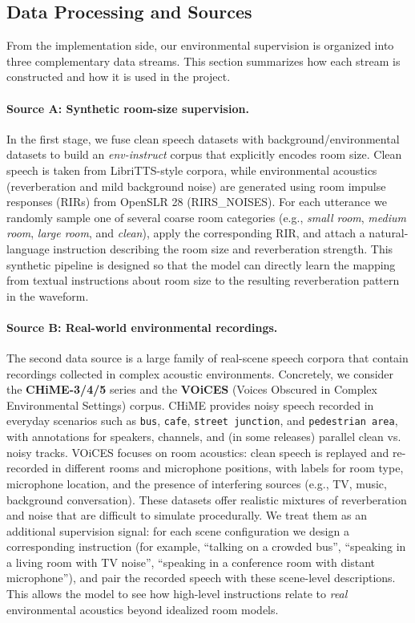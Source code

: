 \documentclass{article}
\begin{document}
\subsection{Data Processing and Sources}

From the implementation side, our environmental supervision is organized into three complementary data streams. This section summarizes how each stream is constructed and how it is used in the project.

\paragraph{Source A: Synthetic room-size supervision.}
In the first stage, we fuse clean speech datasets with background/environmental datasets to build an \emph{env-instruct} corpus that explicitly encodes room size. Clean speech is taken from LibriTTS-style corpora, while environmental acoustics (reverberation and mild background noise) are generated using room impulse responses (RIRs) from OpenSLR 28 (RIRS\_NOISES). For each utterance we randomly sample one of several coarse room categories (e.g., \emph{small room}, \emph{medium room}, \emph{large room}, and \emph{clean}), apply the corresponding RIR, and attach a natural-language instruction describing the room size and reverberation strength. This synthetic pipeline is designed so that the model can directly learn the mapping from textual instructions about room size to the resulting reverberation pattern in the waveform.

\paragraph{Source B: Real-world environmental recordings.}
The second data source is a large family of real-scene speech corpora that contain recordings collected in complex acoustic environments. Concretely, we consider the \textbf{CHiME-3/4/5} series and the \textbf{VOiCES} (Voices Obscured in Complex Environmental Settings) corpus. CHiME provides noisy speech recorded in everyday scenarios such as \texttt{bus}, \texttt{cafe}, \texttt{street junction}, and \texttt{pedestrian area}, with annotations for speakers, channels, and (in some releases) parallel clean vs. noisy tracks. VOiCES focuses on room acoustics: clean speech is replayed and re-recorded in different rooms and microphone positions, with labels for room type, microphone location, and the presence of interfering sources (e.g., TV, music, background conversation). These datasets offer realistic mixtures of reverberation and noise that are difficult to simulate procedurally. We treat them as an additional supervision signal: for each scene configuration we design a corresponding instruction (for example, ``talking on a crowded bus'', ``speaking in a living room with TV noise'', ``speaking in a conference room with distant microphone''), and pair the recorded speech with these scene-level descriptions. This allows the model to see how high-level instructions relate to \emph{real} environmental acoustics beyond idealized room models.
\end{document}
